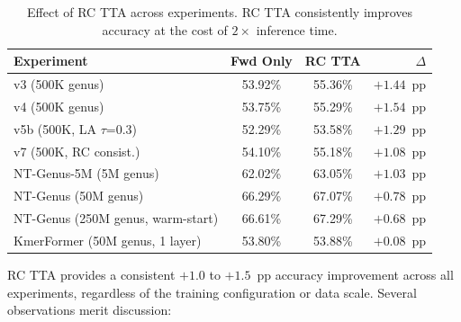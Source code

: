 \begin{table}[htbp]
    \centering
    \caption{Effect of RC TTA across experiments. RC TTA consistently improves accuracy at the cost of $2\times$ inference time.}
    \label{tab:rc-tta}
    \begin{tabular}{lccr}
        \toprule
        \textbf{Experiment} & \textbf{Fwd Only} & \textbf{RC TTA} & \textbf{$\Delta$} \\
        \midrule
        v3 (500K genus) & 53.92\% & 55.36\% & $+1.44$~pp \\
        v4 (500K genus) & 53.75\% & 55.29\% & $+1.54$~pp \\
        v5b (500K, LA $\tau$=0.3) & 52.29\% & 53.58\% & $+1.29$~pp \\
        v7 (500K, RC consist.) & 54.10\% & 55.18\% & $+1.08$~pp \\
        NT-Genus-5M (5M genus) & 62.02\% & 63.05\% & $+1.03$~pp \\
        NT-Genus (50M genus) & 66.29\% & 67.07\% & $+0.78$~pp \\
        NT-Genus (250M genus, warm-start) & 66.61\% & 67.29\% & $+0.68$~pp \\
        KmerFormer (50M genus, 1 layer)   & 53.80\% & 53.88\% & $+0.08$~pp \\
        \bottomrule
    \end{tabular}
\end{table}

RC TTA provides a consistent $+1.0$ to $+1.5$~pp accuracy improvement across all experiments, regardless of the training configuration or data scale. Several observations merit discussion:

